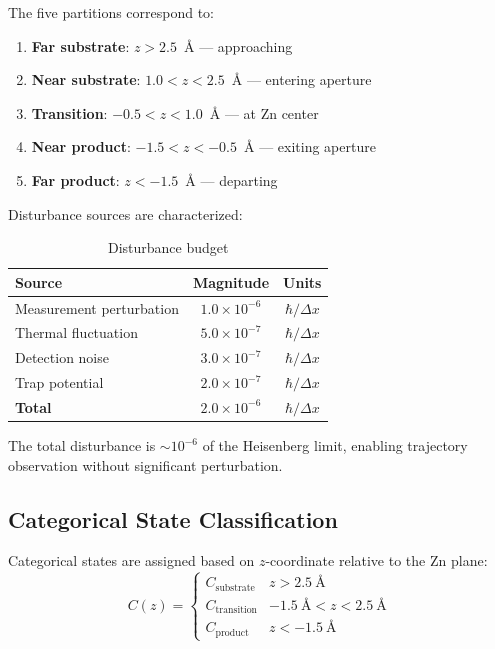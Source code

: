 \documentclass[twocolumn,amsmath,amssymb,aps,prb,superscriptaddress,longbibliography]{revtex4-2}
\begin{document}
The five partitions correspond to:
\begin{enumerate}
\item \textbf{Far substrate}: $z > 2.5$~\AA{} ---  approaching
\item \textbf{Near substrate}: $1.0 < z < 2.5$~\AA{} --- entering aperture
\item \textbf{Transition}: $-0.5 < z < 1.0$~\AA{} --- at Zn center
\item \textbf{Near product}: $-1.5 < z < -0.5$~\AA{} --- exiting aperture
\item \textbf{Far product}: $z < -1.5$~\AA{} ---  departing
\end{enumerate}

Disturbance sources are characterized:

\begin{table}[h]
\centering
\caption{Disturbance budget}
\label{tab:disturbance}
\begin{tabular}{lcc}
\toprule
Source & Magnitude & Units \\
\midrule
Measurement perturbation & $1.0 \times 10^{-6}$ & $\hbar/\Delta x$ \\
Thermal fluctuation & $5.0 \times 10^{-7}$ & $\hbar/\Delta x$ \\
Detection noise & $3.0 \times 10^{-7}$ & $\hbar/\Delta x$ \\
Trap potential & $2.0 \times 10^{-7}$ & $\hbar/\Delta x$ \\
\midrule
\textbf{Total} & $2.0 \times 10^{-6}$ & $\hbar/\Delta x$ \\
\bottomrule
\end{tabular}
\end{table}

The total disturbance is $\sim 10^{-6}$ of the Heisenberg limit, enabling trajectory observation without significant perturbation.

\subsection{Categorical State Classification}
\label{sec:classification}

Categorical states are assigned based on $z$-coordinate relative to the Zn plane:
\begin{equation}
C(z) = \begin{cases}
C_{\text{substrate}} & z > 2.5~\text{\AA} \\
C_{\text{transition}} & -1.5~\text{\AA} < z < 2.5~\text{\AA} \\
C_{\text{product}} & z < -1.5~\text{\AA}
\end{cases}
\label{eq:classification}
\end{equation}
\end{document}
